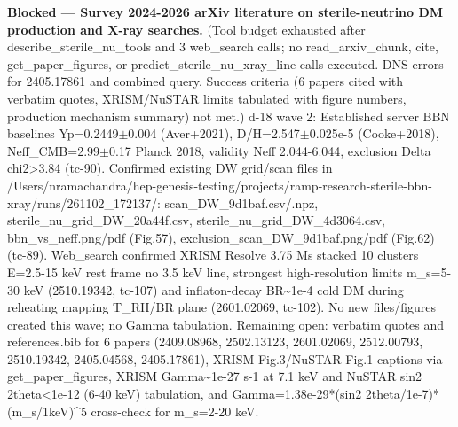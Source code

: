\documentclass[11pt,a4paper]{article}
\begin{document}
\textbf{Blocked --- Survey 2024-2026 arXiv literature on sterile-neutrino DM production and X-ray searches.} (Tool budget exhausted after describe\_sterile\_nu\_tools and 3 web\_search calls; no read\_arxiv\_chunk, cite, get\_paper\_figures, or predict\_sterile\_nu\_xray\_line calls executed. DNS errors for 2405.17861 and combined query. Success criteria (6 papers cited with verbatim quotes, XRISM/NuSTAR limits tabulated with figure numbers, production mechanism summary) not met.) d-18 wave 2: Established server BBN baselines Yp=0.2449$\pm$0.004 (Aver+2021), D/H=2.547$\pm$0.025e-5 (Cooke+2018), Neff\_CMB=2.99$\pm$0.17 Planck 2018, validity Neff 2.044-6.044, exclusion Delta chi2\textgreater{}3.84 (tc-90). Confirmed existing DW grid/scan files in /Users/nramachandra/hep-genesis-testing/projects/ramp-research-sterile-bbn-xray/runs/261102\_172137/: scan\_DW\_9d1baf.csv/.npz, sterile\_nu\_grid\_DW\_20a44f.csv, sterile\_nu\_grid\_DW\_4d3064.csv, bbn\_vs\_neff.png/pdf (Fig.57), exclusion\_scan\_DW\_9d1baf.png/pdf (Fig.62) (tc-89). Web\_search confirmed XRISM Resolve 3.75 Ms stacked 10 clusters E=2.5-15 keV rest frame no 3.5 keV line, strongest high-resolution limits m\_s=5-30 keV (2510.19342, tc-107) and inflaton-decay BR\textasciitilde{}1e-4 cold DM during reheating mapping T\_RH/BR plane (2601.02069, tc-102). No new files/figures created this wave; no Gamma tabulation. Remaining open: verbatim quotes and references.bib for 6 papers (2409.08968, 2502.13123, 2601.02069, 2512.00793, 2510.19342, 2405.04568, 2405.17861), XRISM Fig.3/NuSTAR Fig.1 captions via get\_paper\_figures, XRISM Gamma\textasciitilde{}1e-27 s-1 at 7.1 keV and NuSTAR sin2 2theta\textless{}1e-12 (6-40 keV) tabulation, and Gamma=1.38e-29*(sin2 2theta/1e-7)*(m\_s/1keV)\textasciicircum{}5 cross-check for m\_s=2-20 keV.
\end{document}
